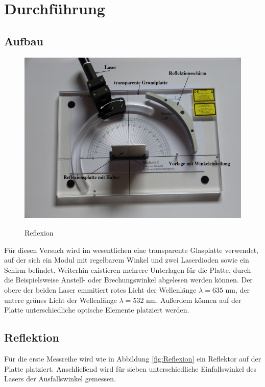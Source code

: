 \section{Durchführung}
\subsection{Aufbau}
\begin{figure} [h]
    \centering
    \includegraphics[width=12cm, keepaspectratio]{Reflexion Aufbau}
    \label{fig:Versuchsanordnung (Reflexion)}
    \caption{Reflexion}
 \end{figure}
Für diesen Versuch wird im wesentlichen eine transparente Glasplatte verwendet, auf der sich ein Modul mit regelbarem Winkel und zwei Laserdioden sowie ein Schirm befindet. Weiterhin existieren mehrere Unterlagen für die Platte, durch die Beispielsweise Anstell- oder Brechungswinkel abgelesen werden können. Der obere der beiden Laser emmitiert rotes Licht der Wellenlänge  $\lambda=635$ nm, der untere grünes Licht der Wellenlänge $\lambda=532$ nm. Außerdem können auf der Platte unterschiedliche optische Elemente platziert werden.
\subsection{Reflektion}
Für die erste Messreihe wird wie in Abbildung \ref{fig:Reflexion} ein Reflektor auf der Platte platziert. Anschließend wird für sieben unterschiedliche Einfallswinkel des Lasers der Ausfallswinkel gemessen.
